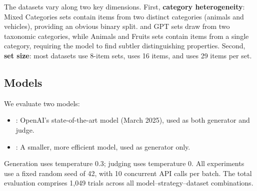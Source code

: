 The datasets vary along two key dimensions.
First, \textbf{category heterogeneity}: Mixed Categories sets contain items from two distinct categories (\eg animals and vehicles), providing an obvious binary split.
\mcrae and GPT sets draw from two taxonomic categories, while Animals and Fruits sets contain items from a single category, requiring the model to find subtler distinguishing properties.
Second, \textbf{set size}: most datasets use 8-item sets,  uses 16 items, and \bigbench uses 29 items per set.

\subsection{Models}

We evaluate two models:
\begin{itemize}[leftmargin=*,itemsep=0pt,topsep=0pt]
    \item \gptfull: OpenAI's state-of-the-art model (March 2025), used as both generator and judge.
    \item \gptmini: A smaller, more efficient model, used as generator only.
\end{itemize}

Generation uses temperature 0.3; judging uses temperature 0.
All experiments use a fixed random seed of 42, with 10 concurrent API calls per batch.
The total evaluation comprises 1,049 trials across all model--strategy--dataset combinations.
